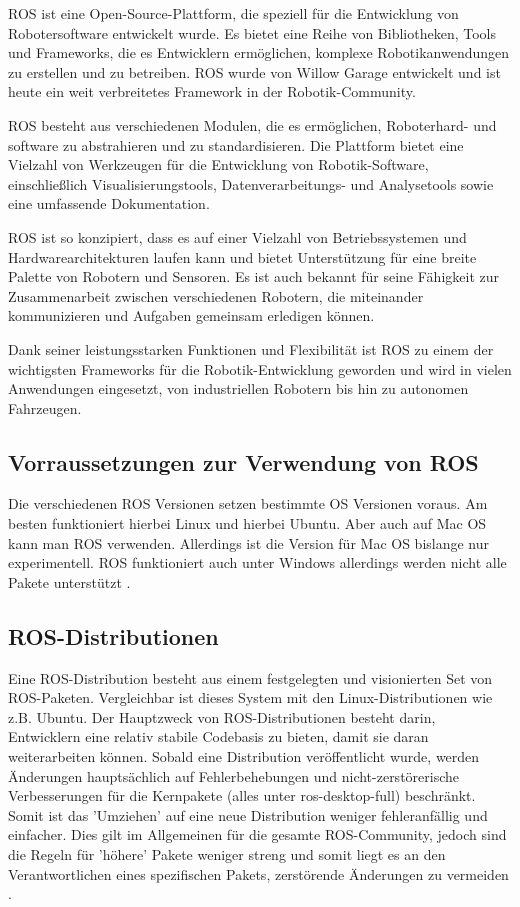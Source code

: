 \ac{ROS} ist eine Open-Source-Plattform, die speziell für die Entwicklung von Robotersoftware entwickelt wurde. Es bietet eine Reihe von Bibliotheken, Tools und Frameworks, die es Entwicklern ermöglichen, komplexe Robotikanwendungen zu erstellen und zu betreiben. \ac{ROS} wurde von Willow Garage entwickelt und ist heute ein weit verbreitetes Framework in der Robotik-Community.

\ac{ROS} besteht aus verschiedenen Modulen, die es ermöglichen, Roboterhard-  und software zu abstrahieren und zu standardisieren. Die Plattform bietet eine Vielzahl von Werkzeugen für die Entwicklung von Robotik-Software, einschließlich Visualisierungstools, Datenverarbeitungs- und Analysetools sowie eine umfassende Dokumentation.

\ac{ROS} ist so konzipiert, dass es auf einer Vielzahl von Betriebssystemen und Hardwarearchitekturen laufen kann und bietet Unterstützung für eine breite Palette von Robotern und Sensoren. Es ist auch bekannt für seine Fähigkeit zur Zusammenarbeit zwischen verschiedenen Robotern, die miteinander kommunizieren und Aufgaben gemeinsam erledigen können.

Dank seiner leistungsstarken Funktionen und Flexibilität ist \ac{ROS} zu einem der wichtigsten Frameworks für die Robotik-Entwicklung geworden und wird in vielen Anwendungen eingesetzt, von industriellen Robotern bis hin zu autonomen Fahrzeugen. \cite[vgl.][]{ROSIntroduction}

    \subsection{Vorraussetzungen zur Verwendung von ROS} \label{Vorraussetzungen zur Verwendung von ROS:subsection}
    Die verschiedenen \ac{ROS} Versionen setzen bestimmte \ac{OS} Versionen voraus. Am besten funktioniert hierbei Linux und hierbei Ubuntu. Aber auch auf Mac OS kann man ROS verwenden. Allerdings ist die Version für Mac OS bislange nur experimentell. \ac{ROS} funktioniert auch unter Windows allerdings werden nicht alle Pakete unterstützt \cite[vgl.][]{ROSIntroduction}.

    \subsection{ROS-Distributionen} \label{ROS-Distributionen:subsection}
    Eine ROS-Distribution besteht aus einem festgelegten und visionierten Set von ROS-Paketen. Vergleichbar ist dieses System mit den Linux-Distributionen wie z.B. Ubuntu. Der Hauptzweck von ROS-Distributionen besteht darin, Entwicklern eine relativ stabile Codebasis zu bieten, damit sie daran weiterarbeiten können. Sobald eine Distribution veröffentlicht wurde, werden Änderungen hauptsächlich auf Fehlerbehebungen und nicht-zerstörerische Verbesserungen für die Kernpakete (alles unter ros-desktop-full) beschränkt. Somit ist das 'Umziehen' auf eine neue Distribution weniger fehleranfällig und einfacher. Dies gilt im Allgemeinen für die gesamte ROS-Community, jedoch sind die Regeln für 'höhere' Pakete weniger streng und somit liegt es an den Verantwortlichen eines spezifischen Pakets, zerstörende Änderungen zu vermeiden \cite[vgl.][]{ROScontributions}.

